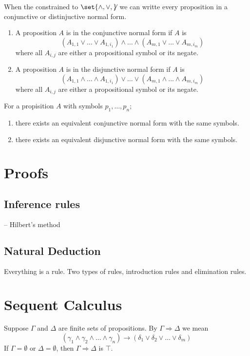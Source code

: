 When the constrained to \(\set{\land,\lor,\not}\) we can writte every proposition in a conjunctive or distinjuctive normal form. 
\begin{enumerate}
    \item A proposition \(A\) is in the conjunctive normal form if \(A\) is 
    \begin{equation*}
        (A_{1,1} \lor \dots \lor A_{1,i_1}) \land \dots \land (A_{m,1} \lor \dots \lor A_{m,i_m})
    \end{equation*}
    where all \(A_{i,j}\) are either a propositional symbol or its negate.
    \item A proposition \(A\) is in the disjunctive normal form if \(A\) is 
    \begin{equation*}
        (A_{1,1} \land \dots \land A_{1,i_1}) \lor \dots \lor (A_{m,1} \land \dots \land A_{m,i_m})
    \end{equation*}
    where all \(A_{i,j}\) are either a propositional symbol or its negate.
\end{enumerate}

\begin{theorem}
    For a propisition \(A\) with symbols \(p_1,\dots,p_n\);
    \begin{enumerate}
        \item there exists an equivalent conjunctive normal form with the same symbols.
         \item there exists an equivalent disjunctive normal form with the same symbols.
    \end{enumerate}
\end{theorem}

\section{Proofs}
 \subsection{Inference rules}
 -- Hilbert's method
 \subsection{Natural Deduction}
 Everything is a rule. Two types of rules, introduction rules and elimination rules.


\section{Sequent Calculus}
Suppose \(\Gamma\) and \(\Delta\) are finite sets of propositions. By \(\Gamma \Rightarrow \Delta\) we mean 
\begin{equation}
   ( \gamma_1 \land \gamma_2 \land \dots \land \gamma_n) \to (\delta_1 \lor \delta_2 \lor \dots \lor \delta_m)
\end{equation}
If \(\Gamma = \emptyset\) or \(\Delta = \emptyset\), then \(\Gamma \Rightarrow \Delta\) is \(\top\).


